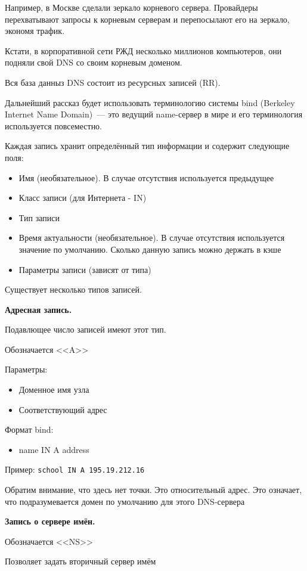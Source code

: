 Например, в Москве сделали зеркало корневого сервера. Провайдеры перехватывают запросы к корневым серверам и перепосылают его на зеркало, экономя трафик.

Кстати, в корпоративной сети РЖД несколько миллионов компьютеров, они подняли свой DNS со своим корневым доменом.

Вся база данныз DNS состоит из ресурсных записей (RR).

Дальнейший рассказ будет использовать терминологию системы bind (Berkeley Internet Name Domain)~--- это ведущий name-сервер в мире и его терминология используется повсеместно.

Каждая запись хранит определённый тип информации и содержит следующие поля:
\begin{itemize}
    \item Имя (необязательное). В случае отсутствия используется предыдущее
    \item Класс записи (для Интернета - IN)
    \item Тип записи
    \item Время актуальности (необязательное). В случае отсутствия используется значение по умолчанию. Сколько данную запись можно держать в кэше
    \item Параметры записи (зависят от типа)
\end{itemize}

Существует несколько типов записей.

{\bf Адресная запись.}

Подавлющее число записей имеют этот тип.

Обозначается <<A>>

Параметры:
\begin{itemize}
    \item Доменное имя узла
    \item Соответствующий адрес
\end{itemize}
Формат bind:
\begin{itemize}
    \item name IN A address
\end{itemize}
Пример: {\tt school IN A 195.19.212.16}

Обратим внимание, что здесь нет точки. Это относительный адрес. Это означает, что подразумевается домен по умолчанию для этого DNS-сервера

{\bf Запись о сервере имён.}

Обозначается <<NS>>

Позволяет задать вторичный сервер имём

